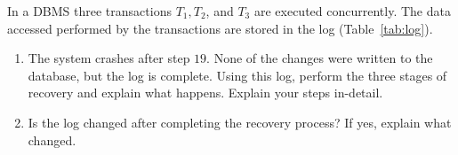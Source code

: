 \newpage
{}

In a DBMS three transactions $T_1,T_2$, and $T_3$ are executed concurrently. The data accessed performed by the transactions are stored in the log (Table~\ref{tab:log}).

\begin{enumerate}
  \item The system crashes after step $19$. None of the changes were written to the database, but the log is complete. Using this log, perform the three stages of recovery and explain what happens. 
  Explain your steps in-detail.

  \item Is the log changed after completing the recovery process? If yes, explain what changed.

\end{enumerate}

